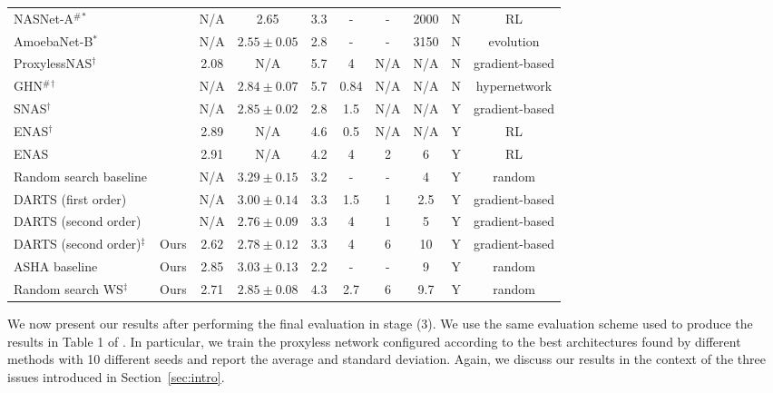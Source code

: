 \documentclass[acmlarge, nonacm]{acmart}
\begin{document}
\begin{table}[h]
{\begin{tabular}{lccccccccc}
\hline
NASNet-A${^\#}{^*}$ & \citep{Zoph2018LearningTA} & N/A & 2.65 & 3.3 &- &-&2000 & N & RL \\
AmoebaNet-B$^*$ & \citep{Real2018} & N/A & $2.55 \pm 0.05$ & 2.8 &- &-&3150 & N & evolution \\
ProxylessNAS$^\dagger$ & \citep{cai2018proxylessnas} & 2.08 & N/A & 5.7 & 4 & N/A & N/A & N & gradient-based \\
GHN${^\#}{^\dagger}$ & \citep{zhang2018graph} & N/A & $2.84 \pm 0.07$ & 5.7 & 0.84 & N/A & N/A & N & hypernetwork \\
SNAS$^\dagger$ & \citep{xie2018snas}  & N/A & $2.85 \pm 0.02$ & 2.8 & 1.5& N/A & N/A& Y & gradient-based \\
ENAS$^\dagger$ & \citep{pham18ENAS} & 2.89 & N/A & 4.6 & 0.5 & N/A & N/A & Y & RL \\
ENAS & \citep{liu2018darts} & 2.91 & N/A & 4.2 & 4 & 2& 6 &Y & RL \\
 Random search baseline & \citep{liu2018darts} & N/A & $3.29 \pm 0.15$ & 3.2 & -&-&4 & Y & random \\
 DARTS (first order)   & \citep{liu2018darts}   &  N/A & $3.00 \pm 0.14$ & 3.3 & 1.5 & 1 & 2.5 & Y & gradient-based\\
 DARTS (second order)& \citep{liu2018darts} &  N/A & $2.76 \pm 0.09$ & 3.3 & 4 & 1& 5 &Y & gradient-based \\
\hline
DARTS (second order)$^\ddagger$&  Ours &  $2.62$ & $2.78\pm 0.12$ & 3.3 & 4 & 6 & 10 & Y & gradient-based \\
ASHA baseline & Ours & 2.85 & $3.03\pm 0.13$& 2.2 & - & - &9 & Y & random\\
 Random search WS$^\ddagger$ &  Ours & 2.71 & $2.85\pm 0.08 $& 4.3 & 2.7 & 6 & 9.7 &Y & random \\
 \hline
 
\end{tabular}
}

\end{table}
We now present our results after performing the final evaluation in stage (3).  We use the same evaluation scheme used to produce the results in Table 1 of \citet{liu2018darts}.  In particular, we train the proxyless network configured according to the best architectures found by different methods with 10 different seeds and report the average and standard deviation.  Again, we discuss our results in the context of the three issues introduced in Section~\ref{sec:intro}.
\end{document}
